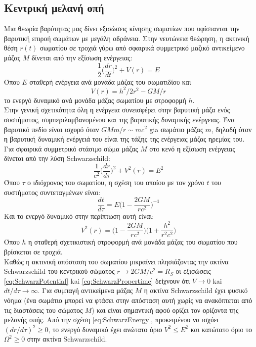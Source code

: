 \subsection{Κεντρική μελανή οπή}

Μια θεωρία βαρύτητας μας δίνει εξισώσεις κίνησης σωματίων που υφίστανται την βαρυτική επιροή σωμάτων με μεγάλη αδράνεια. Στην νευτώνεια θεώρηση, η ακτινική θέση $r(t)$ σωματίου σε τροχιά γύρω από σφαιρικά συμμετρικό μαζικό αντικείμενο μάζας $Μ$ δίνεται από την εξίσωση ενέργειας:
\begin{equation}
    \dfrac{1}{2} \Big( \dfrac{dr}{dt} \Big)^2 + V(r) = E
\end{equation}
Όπου $Ε$ σταθερή ενέργεια ανά μονάδα μάζας του σωματιδίου και 
\begin{equation}
    V(r)=h^2/2r^2- GM/r
\end{equation}
το ενεργό δυναμικό ανά μονάδα μάζας σωματίου με στροφορμή $h$.\\
Στην γενική σχετικότητα όλη η ενέργεια συνεισφέρει στην βαρυτική μάζα ενός συστήματος, συμπεριλαμβανομένου και της βαρυτικής δυναμικής ενέργειας. Ένα βαρυτικό πεδίο είναι ισχυρό όταν $GM m/r \sim mc^2$ gia σωμάτιο μάζας $m$, δηλαδή όταν η βαρυτική δυναμική ενέργειά του είναι της τάξης της ενέργειας μάζας ηρεμίας του. Για σφαιρικά συμμετρικό στάσιμο σώμα μάζας $Μ$ στο κενό η εξίσωση ενέργειας δίνεται από την λύση \textlatin{Schwarzschild}: 
\begin{equation}
    \dfrac{1}{c^2} \Big( \dfrac{dr}{d\tau} \Big)^2 + V^2(r) = E^2 \label{eq:SchwarzEnergy}
\end{equation}
Όπου $\tau$ ο ιδιόχρονος του σωματίου, η σχέση του οποίου με τον χρόνο $t$ του συστήματος συντεταγμένων είναι: 
\begin{equation}
    \dfrac{dt}{d\tau}  = E \Big(1 - \dfrac{2GM}{rc^2}  \Big)^{-1} \label{eq:SchwarzPropertime}
\end{equation}
Και το ενεργό δυναμικό στην περίπτωση αυτή είναι:
\begin{equation}
    V^2(r) =  \Big( 1 - \dfrac{2GM}{rc^2}  \Big)   \Big( 1 + \dfrac{h^2}{r^2c^2}  \Big) \label{eq:SchwarzPotential}
\end{equation}
Όπου  $h$ η σταθερή σχετικιστική στροφορμή ανά μονάδα μάζας του σωματίου που βρίσκεται σε τροχιά.\\
Καθώς η ακτινική απόσταση του σωματίου μικραίνει πλησιάζοντας την ακτίνα  \textlatin{Schwarzschild} του κεντρικού σώματος $ r \rightarrow 2GM/c^2 = R_S$ οι εξισώσεις \ref{eq:SchwarzPotential} kai \ref{eq:SchwarzPropertime} δείχνουν ότι $V \rightarrow 0$ kai $dt/d\tau \rightarrow \infty$. Για συμπαγή αντικείμενα μάζας $Μ$ η ακτίνα \textlatin{Schwarzschild} έχει φυσικό νόημα (ένα σωμάτιο μπορεί να φτάσει στην απόσταση αυτή χωρίς να ανακόπτεται από τις διαστάσεις του σώματος $Μ$) και είναι σημαντική αφού ορίζει τον ορίζοντα της μελανής οπής. Από την σχέση \ref{eq:SchwarzEnergy}, προκειμένου να ισχύει $(dr/d\tau)^2 \geq 0$, το ενεργό δυναμικό έχει ανώτατο όριο $V^2 \leq E^2$ και κατώτατο όριο το $Ω^2 \geq 0$ στην ακτίνα \textlatin{Schwarzschild}. 

